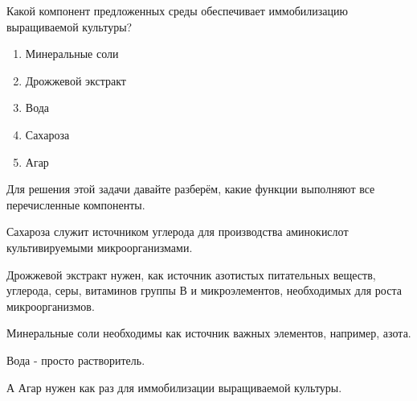 
Какой компонент предложенных среды обеспечивает иммобилизацию выращиваемой культуры?

\begin{enumerate}
    \item Минеральные соли
    \item Дрожжевой экстракт
    \item Вода
    \item Сахароза
    \item Агар
\end{enumerate}

\explanationSection

Для решения этой задачи давайте разберём, какие функции выполняют все перечисленные компоненты.

Сахароза служит источником углерода для производства аминокислот культивируемыми микроорганизмами. 

Дрожжевой экстракт нужен, как источник азотистых питательных веществ, углерода, серы, витаминов группы В и микроэлементов, необходимых для роста микроорганизмов.

Минеральные соли необходимы как источник важных элементов, например, азота.

Вода - просто растворитель.

А Агар нужен как раз для иммобилизации выращиваемой культуры.

